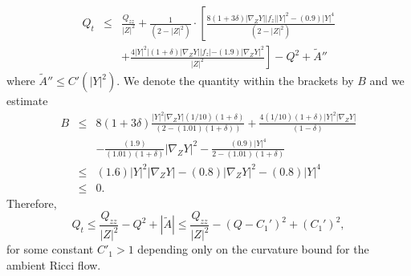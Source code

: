 \begin{eqnarray*}
Q_t & \le & \frac{Q_{zz}}{|Z|^2} +\frac{1}{(2-|Z|^2)}\cdot
\left[\frac{8(1+3\delta)|\nabla_ZY||f_z||Y|^2-(0.9)|Y|^4}{(2-|Z|^2)} \right.\\&
&
 +\left. \frac{4|Y|^2|(1+\delta)
 |\nabla_ZY||f_z|-(1.9)|\nabla_ZY|^2}{|Z|^2}\right]-Q^2+\tilde A''
\end{eqnarray*}
where $\tilde A''\le C'(|Y|^2)$. We denote the quantity within the
brackets by $B$ and we estimate
\begin{eqnarray*}
B & \le &
8(1+3\delta)\frac{|Y|^2|\nabla_ZY|(1/10)(1+\delta)}{(2-(1.01)(1+\delta))}
+\frac{4(1/10)(1+\delta)|Y|^2|\nabla_ZY|}{(1-\delta)} \\
& & -\frac{(1.9)}{(1.01)(1+\delta)}|\nabla_ZY|^2
-\frac{(0.9)|Y|^4}{2-(1.01)(1+\delta)} \\
& \le  & (1.6)|Y|^2|\nabla_ZY|-(0.8)|\nabla_ZY|^2-(0.8)|Y|^4 \\
& \le  & 0.
\end{eqnarray*}
Therefore,
$$Q_t\le \frac{Q_{zz}}{|Z|^2}-Q^2+|\tilde A|\le \frac{Q_{zz}}{|Z|^2}-(Q-C_1')^2+(C_1')^2,$$
for some constant $C'_1>1$ depending only on the curvature bound for the
ambient Ricci flow.



